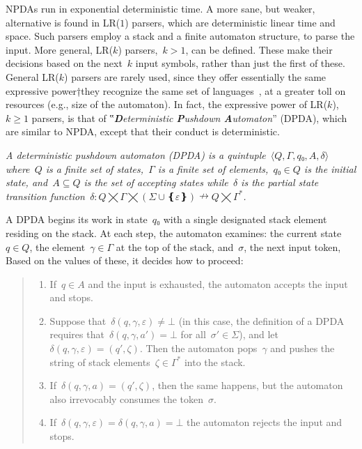 NPDAs run in exponential deterministic time.
 A more sane, but weaker, alternative is found in LR($1$) parsers,
  which are deterministic linear time and space.
Such parsers employ a stack and a finite automaton structure,
  to parse the input.
 More general, LR($k$) parsers,~$k>1$, can be defined. These make their
 decisions based on the next~$k$ input symbols, rather than just the first of these.
 General LR($k$) parsers are rarely used, since they offer essentially
 the same expressive power†{they recognize the same set of languages~\cite{Knuth:65}},
 at a greater toll on resources (e.g., size of the automaton).
In fact, the expressive power of LR($k$),~$k\ge1$ parsers, is that
 of ‟\emph{\textbf Deterministic \textbf Pushdown \textbf Automaton}” (DPDA),
  which are similar to NPDA, except that their conduct is deterministic.

\begin{Definition}
  \label{Definition:DPDA}
  \slshape
  A \textit{deterministic pushdown automaton} (DPDA) is a quintuple~$⟨Q,Γ,q₀,A,δ⟩$
  where~$Q$ is a finite set of \emph{states},~$Γ$ is a finite
  \emph{set of elements},~$q₀∈Q$ is the initial state,
  and~$A⊆Q$ is the \emph{set of accepting states} while~$δ$ is
  the \emph{partial state transition function}~$δ:Q⨉Γ⨉(Σ∪❴ε❵)↛Q⨉Γ^*$.
  \par
  A DPDA begins its work in state~$q₀$ with a single designated stack element residing on the stack.
  At each step, the automaton examines: the current state~$q∈Q$, 
  the element~$γ∈Γ$ at the top of the stack, and~$σ$, the next input token, 
  Based on the values of these, it decides how to proceed:
  \begin{quote}
  \begin{enumerate}
    \item If~$q∈A$ and the input is exhausted, the automaton accepts the input and stops.
    \item Suppose that~$δ(q,γ,ε)≠⊥$ (in this case, the definition of a DPDA
          requires that~$δ(q,γ,a')=⊥$ for all~$σ'∈Σ$), and let~$δ(q,γ,ε)=(q',ζ)$.
          Then the automaton pops~$γ$ and pushes the string of stack
          elements~$ζ∈Γ^*$ into the stack.
    \item If~$δ(q,γ,a)=(q',ζ)$, then the same happens, but the automaton also
          irrevocably consumes the token~$σ$.
    \item If~$δ(q,γ,ε)=δ(q,γ,a)=⊥$ the automaton rejects the input and stops.
  \end{enumerate}
  \end{quote}
\end{Definition}

